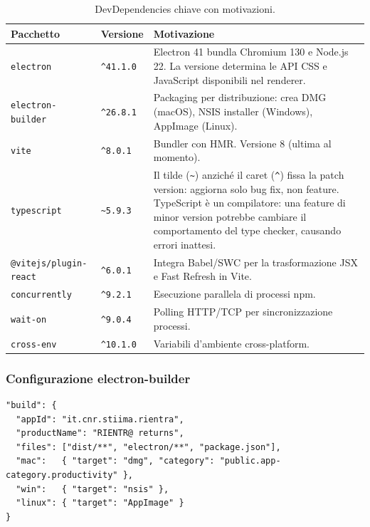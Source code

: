 \documentclass[a4paper,12pt]{article}
\begin{document}
\begin{table}[H]
\centering\small
\caption{DevDependencies chiave con motivazioni.}
\begin{tabular}{L{4.5cm} L{2cm} L{6cm}}
\toprule
\textbf{Pacchetto} & \textbf{Versione} & \textbf{Motivazione} \\
\midrule
\texttt{electron} & \texttt{\^{}41.1.0} &
  Electron 41 bundla Chromium 130 e Node.js 22. La versione
  determina le API CSS e JavaScript disponibili nel renderer. \\[3pt]
\texttt{electron-builder} & \texttt{\^{}26.8.1} &
  Packaging per distribuzione: crea DMG (macOS), NSIS installer
  (Windows), AppImage (Linux). \\[3pt]
\texttt{vite} & \texttt{\^{}8.0.1} &
  Bundler con HMR. Versione 8 (ultima al momento). \\[3pt]
\texttt{typescript} & \texttt{\~{}5.9.3} &
  Il tilde (\texttt{\~{}}) anzich\'{e} il caret (\texttt{\^{}}) fissa
  la patch version: aggiorna solo bug fix, non feature. TypeScript \`{e}
  un compilatore: una feature di minor version potrebbe cambiare il
  comportamento del type checker, causando errori inattesi. \\[3pt]
\texttt{@vitejs/plugin-react} & \texttt{\^{}6.0.1} &
  Integra Babel/SWC per la trasformazione JSX e Fast Refresh in Vite. \\[3pt]
\texttt{concurrently} & \texttt{\^{}9.2.1} &
  Esecuzione parallela di processi npm. \\[3pt]
\texttt{wait-on} & \texttt{\^{}9.0.4} &
  Polling HTTP/TCP per sincronizzazione processi. \\[3pt]
\texttt{cross-env} & \texttt{\^{}10.1.0} &
  Variabili d'ambiente cross-platform. \\
\bottomrule
\end{tabular}
\end{table}

\subsubsection{Configurazione electron-builder}
\vspace{2pt}
\begin{lstlisting}[language={}]
"build": {
  "appId": "it.cnr.stiima.rientra",
  "productName": "RIENTR@ returns",
  "files": ["dist/**", "electron/**", "package.json"],
  "mac":   { "target": "dmg", "category": "public.app-category.productivity" },
  "win":   { "target": "nsis" },
  "linux": { "target": "AppImage" }
}
\end{lstlisting}
\end{document}
